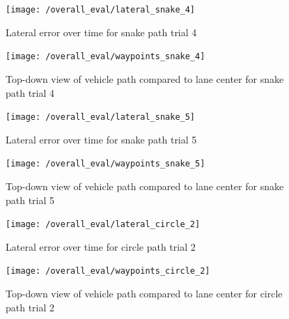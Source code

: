 \documentclass[titlepage, draft]{article}
\begin{document}
{\begin{figure}[H]
	\centering
	\begin{minipage}{.45\textwidth}
		\centering
		\texttt{[image: /overall\_eval/lateral\_snake\_4]}
		\caption{Lateral error over time for snake path trial 4}
		\label{fig:snake_lat_4}
	\end{minipage}%
	\hspace{0.1\textwidth}%
	\begin{minipage}{.45\textwidth}
		\centering
		\texttt{[image: /overall\_eval/waypoints\_snake\_4]}
		\caption{Top-down view of vehicle path compared to lane center for snake path trial 4}
		\label{fig:snake_way_4}
	\end{minipage}
\end{figure}

\begin{figure}[H]
	\centering
	\begin{minipage}{.45\textwidth}
		\centering
		\texttt{[image: /overall\_eval/lateral\_snake\_5]}
		\caption{Lateral error over time for snake path trial 5}
		\label{fig:snake_lat_5}
	\end{minipage}%
	\hspace{0.1\textwidth}%
	\begin{minipage}{.45\textwidth}
		\centering
		\texttt{[image: /overall\_eval/waypoints\_snake\_5]}
		\caption{Top-down view of vehicle path compared to lane center for snake path trial 5}
		\label{fig:snake_way_5}
	\end{minipage}
\end{figure}








\begin{figure}[H]
	\centering
	\begin{minipage}{.45\textwidth}
		\centering
		\texttt{[image: /overall\_eval/lateral\_circle\_2]}
		\caption{Lateral error over time for circle path trial 2}
		\label{fig:circle_lat_2}
	\end{minipage}%
	\hspace{0.1\textwidth}%
	\begin{minipage}{.45\textwidth}
		\centering
		\texttt{[image: /overall\_eval/waypoints\_circle\_2]}
		\caption{Top-down view of vehicle path compared to lane center for circle path trial 2}
		\label{fig:circle_way_2}
	\end{minipage}
\end{figure}

}
\end{document}
